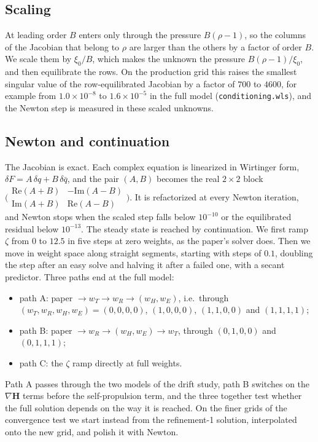 \documentclass[11pt,a4paper]{article}
\newcommand{\upd}[1]{{\color{OliveGreen}#1}}
\renewcommand{\H}{\mathbf{H}}
\begin{document}
\subsection{Scaling}
At leading order $B$ enters only through the pressure $B(\rho-1)$, so the
columns of the Jacobian that belong to $\rho$ are larger than the others by a factor of order
$B$. We scale them by $\xi_0/B$, which makes the unknown the pressure $B(\rho-1)/\xi_0$, and
then equilibrate the rows. On the production grid this raises the smallest singular value of
the row-equilibrated Jacobian by a factor of $700$ to $4600$, for example from
$1.0\times10^{-8}$ to $1.6\times10^{-5}$ in the full model (\texttt{conditioning.wls}), and
the Newton step is measured in these scaled unknowns.

\subsection{Newton and continuation}
The Jacobian is exact. Each complex equation is
linearized in Wirtinger form, $\delta F=A\,\delta q+B\,\delta\bar q$, and the pair $(A,B)$
becomes the real $2\times2$ block
$\bigl(\begin{smallmatrix}\mathrm{Re}(A+B)&-\mathrm{Im}(A-B)\\ \mathrm{Im}(A+B)&\mathrm{Re}(A-B)\end{smallmatrix}\bigr)$.
It is refactorized at every Newton iteration, and Newton stops when the scaled step falls
below $10^{-10}$ or the equilibrated residual below $10^{-13}$. The steady state is reached by continuation. We first ramp $\zeta$ from $0$ to
$12.5$ in five steps at zero weights, as the paper's solver does. Then we move in weight space
along straight segments, starting with steps of $0.1$, doubling the step after an easy solve
and halving it after a failed one, with a secant predictor. Three paths end at the full
model:
\begin{itemize}
  \item path A: paper $\to w_T\to w_R\to(w_H,w_E)$, i.e.\ through
    $(w_T,w_R,w_H,w_E)=(0,0,0,0)$, $(1,0,0,0)$, $(1,1,0,0)$ and $(1,1,1,1)$;
  \item path B: paper $\to w_R\to(w_H,w_E)\to w_T$, through $(0,1,0,0)$ and $(0,1,1,1)$;
  \item path C: the $\zeta$ ramp directly at full weights.
\end{itemize}
Path A passes through the two models of the drift study, path B switches on \upd{the $\nabla\H$
terms} before the self-propulsion term, and the three together test whether the full solution
depends on the way it is reached. On the finer grids of the convergence test we start instead
from the refinement-1 solution, interpolated onto the new grid, and polish it with Newton.
\end{document}
